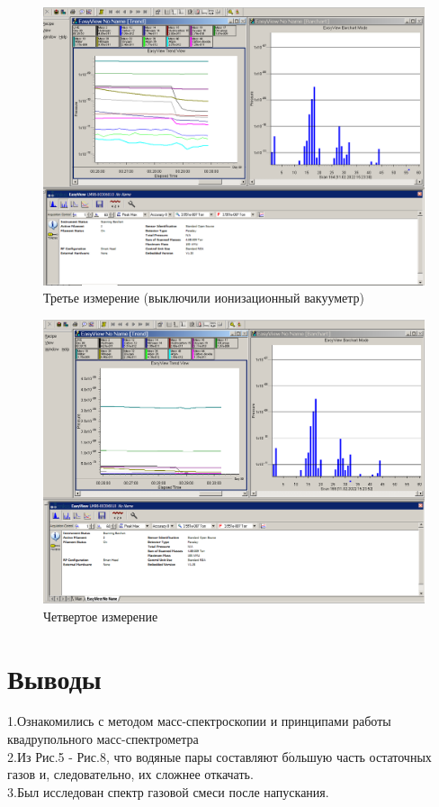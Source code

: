 \documentclass[a4paper,12pt]{article}
\begin{document}
\begin{figure}[h!]
	\begin{center}
	\includegraphics[scale=0.4]{graph7}
	\caption{Третье измерение (выключили ионизационный вакууметр)}
	\end{center}
\end{figure}

\newpage

\begin{figure}[h!]
	\begin{center}
	\includegraphics[scale=0.4]{graph8}
	\caption{Четвертое измерение}
	\end{center}
\end{figure}


\section*{Выводы}

1.Ознакомились с методом масс-спектроскопии и принципами работы квадрупольного масс-спектрометра \\
2.Из Рис.5 - Рис.8, что водяные пары составляют б$\acute{о}$льшую часть остаточных газов и, следовательно, их сложнее откачать. \\
3.Был исследован спектр газовой смеси после напускания.
\end{document}
